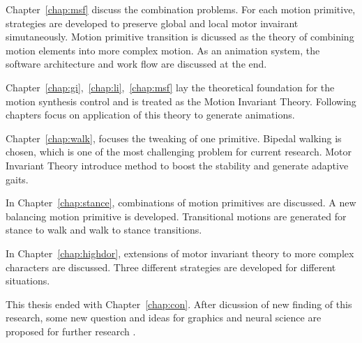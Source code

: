 Chapter~\ref{chap:msf} discuss the combination problems.
For each motion primitive,  strategies are developed to preserve global and local motor invairant simutaneously.
Motion primitive transition is dicussed as the theory of combining motion elements into more complex motion.
As an animation system, the software architecture and work flow are discussed at the end.

Chapter~\ref{chap:gi},~\ref{chap:li},~\ref{chap:msf} lay the theoretical foundation for the motion synthesis control and is treated as the Motion Invariant Theory.
Following chapters focus on application of this theory to generate animations.



Chapter~\ref{chap:walk}, focuses the tweaking of one primitive.
Bipedal walking is chosen, which is one of the most challenging problem for current \cms research.
Motor Invariant Theory introduce method to boost the stability and generate adaptive gaits.


In Chapter~\ref{chap:stance}, combinations of motion primitives are discussed.
A new balancing motion primitive is developed. 
Transitional motions are generated for stance to walk and walk to stance transitions.

In Chapter~\ref{chap:highdor}, extensions of motor invariant theory to more complex characters are discussed.
Three different strategies are developed for different situations.

This thesis ended with Chapter~\ref{chap:con}. 
After dicussion of new finding of this research, some new question and ideas for graphics and neural science are proposed for further research .








